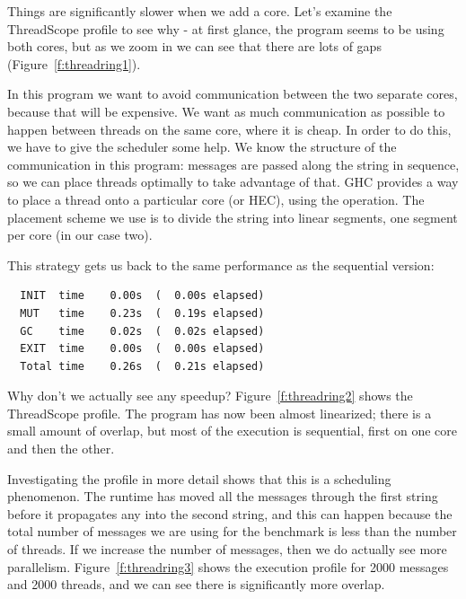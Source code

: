 Things are significantly slower when we add a core.  Let's examine the
ThreadScope profile to see why - at first glance, the program seems to
be using both cores, but as we zoom in we can see that there are lots
of gaps (Figure~\ref{f:threadring1}).  

In this program we want to avoid communication between the two
separate cores, because that will be expensive.  We want as much
communication as possible to happen between threads on the same core,
where it is cheap.  In order to do this, we have to give the scheduler
some help.  We know the structure of the communication in this
program: messages are passed along the string in sequence, so we can
place threads optimally to take advantage of that.  GHC provides a way
to place a thread onto a particular core (or HEC), using the
 operation.  The placement scheme we use is to divide
the string into linear segments, one segment per core (in our case
two).

This strategy gets us back to the same performance as the sequential
version:

\begin{verbatim}
  INIT  time    0.00s  (  0.00s elapsed)
  MUT   time    0.23s  (  0.19s elapsed)
  GC    time    0.02s  (  0.02s elapsed)
  EXIT  time    0.00s  (  0.00s elapsed)
  Total time    0.26s  (  0.21s elapsed)
\end{verbatim}

Why don't we actually see any speedup?
Figure~\ref{f:threadring2} shows the ThreadScope profile.
The program has now been almost linearized; there is a small amount of
overlap, but most of the execution is sequential, first on one core
and then the other.

Investigating the profile in more detail shows that this is a
scheduling phenomenon.  The runtime has moved all the messages through
the first string before it propagates any into the second string, and
this can happen because the total number of messages we are using for
the benchmark is less than the number of threads.  If we increase the
number of messages, then we do actually see more parallelism.
Figure~\ref{f:threadring3} shows the execution profile for 2000
messages and 2000 threads, and we can see there is significantly more
overlap.
